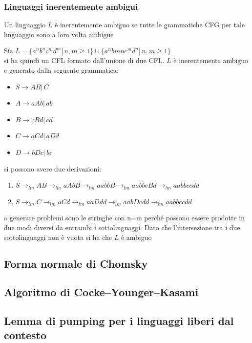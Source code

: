\subsubsection{Linguaggi inerentemente ambigui}
\begin{definition}
	Un linguaggio $L$ è inerentemente ambiguo se tutte le grammatiche CFG per tale linguaggio sono a loro volta ambigue
\end{definition}
\begin{example}
	Sia $L=\{a^nb^nc^md^m|\, n,m\geq 1\}\cup \{a^nbmnc^md^n|\, n,m\geq 1\}$\\
	si ha quindi un CFL formato dall'unione di due CFL. $L$ è inerentemente ambiguo e generato dalla seguente grammatica:
	\begin{itemize}
		\item $S\to AB|\,C$
		\item $A\to aAb|\,ab$
		\item $B\to cBd|\, cd$
		\item $C\to aCd|\, aDd$
		\item $D\to bDc|\, bc$
	\end{itemize}
	si possono avere due derivazioni:
	\begin{enumerate}
		\item $S\to_{lm}AB\to_{lm} aAbB\to_{lm} aabbB\to_{lm}aabbcBd\to_{lm}aabbccdd$
		\item $S\to_{lm} C\to_{lm} aCd\to_{lm}aaDdd\to_{lm}aabDcdd\to_{lm}aabbccdd$
	\end{enumerate}
	a generare problemi sono le stringhe con n=m perché possono essere prodotte in due modi diversi da entrambi i sottolinguaggi. Dato che l'intersezione tra i due sottolinguaggi non è vuota si ha che $L$ è ambiguo
\end{example}
\subsection{Forma normale di Chomsky}\label{sec:cnf}

\subsection{Algoritmo di Cocke--Younger--Kasami}\label{sec:cyk}

\subsection{Lemma di pumping per i linguaggi liberi dal contesto}\label{sec:pumping-cfl}

